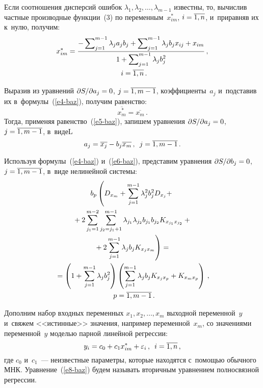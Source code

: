 \begin{multicols}{2}
    
    Если соотношения дисперсий ошибок $\lambda_1, \lambda_2, \ldots , 
\lambda_{m-1}$ известны, то, вычислив частные производные функции~(3) по 
переменным~$x^*_{im}$, $i\hm=\overline{1,n}$, и~приравняв их к~нулю, 
получим:
    \begin{multline}
    x^*_{im}=\displaystyle\frac{\displaystyle -\sum\nolimits_{j=1}^{m-1} \lambda_j a_j b_j 
+\sum\nolimits_{j=1}^{m-1} \lambda_j b_j x_{ij}+x_{im}\mathstrut}{\displaystyle 1+\sum\nolimits_{j=1}^{m-1} \lambda_j b_j^2\mathstrut}\,,\\\enskip i=\overline{1,n}\,.
    \label{e4-baz}
    \end{multline}
    
    Выразив из уравнений $\partial S/\partial a_j\hm=0$, 
$j\hm= \overline{1,m-1}$, коэффициенты~$a_j$ и~подставив их 
в~формулы~(\ref{e4-baz}), получим равенство:
    \begin{equation}
    \overline{x_m^*}=\overline{x_m}\,.
    \label{e5-baz}
    \end{equation}
    Тогда, применяя равенство~(\ref{e5-baz}), запишем уравнения $\partial 
S/\partial a_j\hm=0$, $j\hm= \overline{1,m-1}$, в~видеL
    \begin{equation}
    a_j=\overline{x_j}-b_j \overline{x_m}\,,\enskip j=\overline{1,m-1}\,.
    \label{e6-baz}
    \end{equation}
    
    Используя формулы~(\ref{e4-baz}) и~(\ref{e6-baz}), представим уравнения 
$\partial S/\partial b_j\hm=0$, $j\hm= \overline{1,m-1}$, в~виде нелинейной 
системы:
    \begin{multline}
b_p\left( D_{x_m} +\sum\limits_{j=1}^{m-1} \lambda_j^2 b_j^2 D_{x_j}+\right.{}\\
{}+2 \sum\limits^{m-2}_{j_1=1} \sum\limits^{m-1}_{j_2=j_1+1} 
\lambda_{j_1}\lambda_{j_2}b_{j_1} b_{j_2} 
K_{x_{j_1}x_{j_2}}+{}\\
\left.{}+2\sum\limits_{j=1}^{m-1} \lambda_j b_j K_{x_j 
x_m}\right)={}\\
{}=\left( 1+\sum\limits_{j=1}^{m-1} \lambda_j b_j^2\right)
    \left( \sum\limits^{m-1}_{j=1} \lambda_j b_j K_{x_j x_p}+K_{x_m 
x_p}\right)\,,\\ \enskip
p=\overline{1,m-1}\,.
    \label{e7-baz}
    \end{multline} 
    
    Дополним набор входных переменных $x_1, x_2, \ldots , x_m$ выходной 
переменной~$y$ и~свяжем <<истинные>> значения, например 
переменной~$x_m$, со значениями переменной~$y$ моделью парной линейной 
регрессии:
    \begin{equation}
    y_i=c_0 +c_1 x^*_{im}+\varepsilon_i\,,\enskip i=\overline{1,n}\,,
    \label{e8-baz}
    \end{equation}
где $c_0$ и~$c_1$~--- неизвестные параметры, которые находятся с~помощью 
обычного МНК. Уравнение~(\ref{e8-baz}) будем называть вторичным 
уравнением полносвязной регрессии.
    

\end{multicols}
